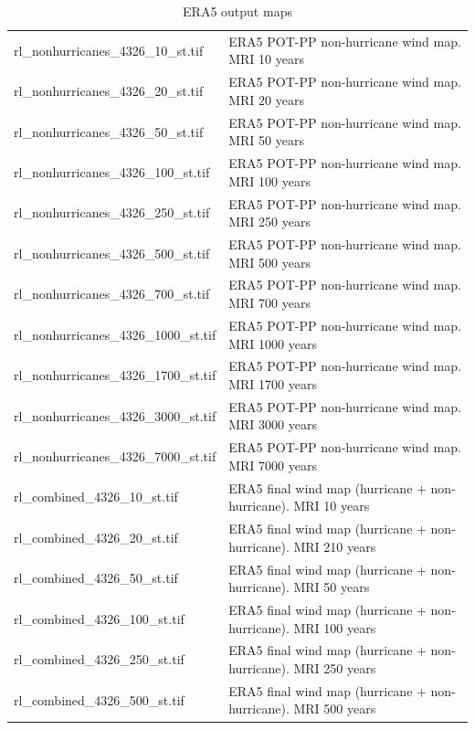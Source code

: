 \documentclass[12pt,oneside]{reedthesis}
\begin{document}
\begingroup\fontsize{8}{10}\selectfont
\begin{longtable}[t]{>{\raggedright\arraybackslash}p{2in}>{\raggedright\arraybackslash}p{3.6in}}
\caption[ERA5 output maps]{\label{tab:era5maps}ERA5 output maps}\\
\toprule
\multicolumn{1}{l}{File} & \multicolumn{1}{l}{Description}\\
\midrule
rl\_nonhurricanes\_4326\_10\_st.tif & ERA5 POT-PP non-hurricane wind map. MRI 10 years\\
rl\_nonhurricanes\_4326\_20\_st.tif & ERA5 POT-PP non-hurricane wind map. MRI 20 years\\
rl\_nonhurricanes\_4326\_50\_st.tif & ERA5 POT-PP non-hurricane wind map. MRI 50 years\\
rl\_nonhurricanes\_4326\_100\_st.tif & ERA5 POT-PP non-hurricane wind map. MRI 100 years\\
rl\_nonhurricanes\_4326\_250\_st.tif & ERA5 POT-PP non-hurricane wind map. MRI 250 years\\
rl\_nonhurricanes\_4326\_500\_st.tif & ERA5 POT-PP non-hurricane wind map. MRI 500 years\\
rl\_nonhurricanes\_4326\_700\_st.tif & ERA5 POT-PP non-hurricane wind map. MRI 700 years\\
rl\_nonhurricanes\_4326\_1000\_st.tif & ERA5 POT-PP non-hurricane wind map. MRI 1000 years\\
rl\_nonhurricanes\_4326\_1700\_st.tif & ERA5 POT-PP non-hurricane wind map. MRI 1700 years\\
rl\_nonhurricanes\_4326\_3000\_st.tif & ERA5 POT-PP non-hurricane wind map. MRI 3000 years\\
rl\_nonhurricanes\_4326\_7000\_st.tif & ERA5 POT-PP non-hurricane wind map. MRI 7000 years\\
rl\_combined\_4326\_10\_st.tif & ERA5 final wind map (hurricane + non-hurricane). MRI 10 years\\
rl\_combined\_4326\_20\_st.tif & ERA5 final wind map (hurricane + non-hurricane). MRI 210 years\\
rl\_combined\_4326\_50\_st.tif & ERA5 final wind map (hurricane + non-hurricane). MRI 50 years\\
rl\_combined\_4326\_100\_st.tif & ERA5 final wind map (hurricane + non-hurricane). MRI 100 years\\
rl\_combined\_4326\_250\_st.tif & ERA5 final wind map (hurricane + non-hurricane). MRI 250 years\\
rl\_combined\_4326\_500\_st.tif & ERA5 final wind map (hurricane + non-hurricane). MRI 500 years\\

\end{longtable}
\end{document}

